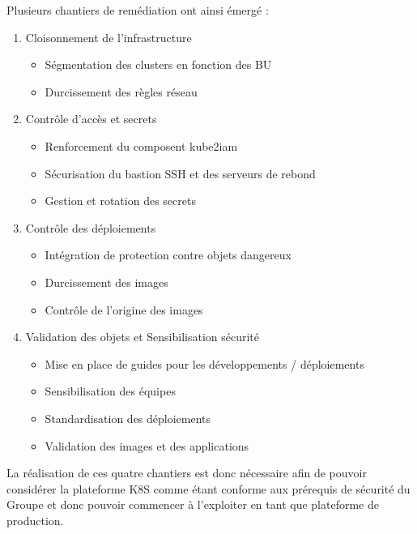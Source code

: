 Plusieurs chantiers de remédiation ont ainsi émergé :
\begin{multicols}{2}
    \begin{enumerate}
        \item Cloisonnement de l'infrastructure
        \begin{itemize}
            \item Ségmentation des clusters en fonction des \ac{BU}
            \item Durcissement des règles réseau
        \end{itemize}
        \item Contrôle d'accès et secrets
        \begin{itemize}
            \item Renforcement du composent kube2iam
            \item Sécurisation du bastion SSH et des serveurs de rebond
            \item Gestion et rotation des secrets
        \end{itemize}
        \columnbreak
        \item Contrôle des déploiements
            \begin{itemize}
            \item Intégration de protection contre objets dangereux
            \item Durcissement des images
            \item Contrôle de l'origine des images
        \end{itemize}
        \item Validation des objets et Sensibilisation sécurité
        \begin{itemize}
            \item Mise en place de guides pour les développements / déploiements
            \item Sensibilisation des équipes
            \item Standardisation des déploiements
            \item Validation des images et des applications
        \end{itemize}
    \end{enumerate}
\end{multicols}

La réalisation de ces quatre chantiers est donc nécessaire afin de pouvoir considérer la plateforme \ac{K8S} comme étant
conforme aux prérequis de sécurité du Groupe et donc pouvoir commencer à l'exploiter en tant que plateforme de production.

